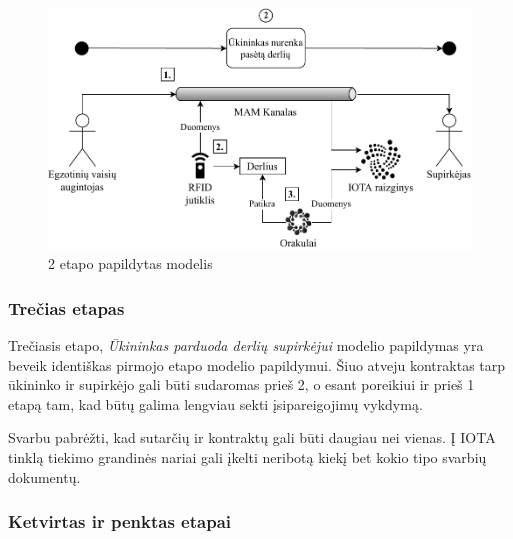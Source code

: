 \begin{figure}[H]
    \centering
    \includegraphics[scale=0.7]{images/iota-usecase-2}
    \caption{2 etapo papildytas modelis}
\end{figure}




\subsubsection{Trečias etapas}

Trečiasis etapo, \textit{Ūkininkas parduoda derlių supirkėjui} modelio papildymas yra beveik identiškas pirmojo etapo modelio papildymui. Šiuo atveju kontraktas tarp ūkininko ir supirkėjo gali būti sudaromas prieš 2, o esant poreikiui ir prieš 1 etapą tam, kad būtų galima lengviau sekti įsipareigojimų vykdymą.

Svarbu pabrėžti, kad sutarčių ir kontraktų gali būti daugiau nei vienas. Į IOTA tinklą tiekimo grandinės nariai gali įkelti neribotą kiekį bet kokio tipo svarbių dokumentų.




\subsubsection{Ketvirtas ir penktas etapai}

